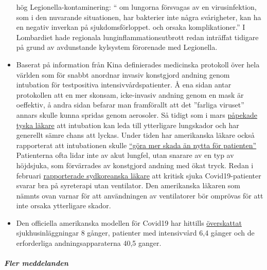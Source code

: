 \begin{itemize}
  hög Legionella-kontaminering: `` om lungorna försvagas av en
  virusinfektion, som i den nuvarande situationen, har bakterier inte
  några svårigheter, kan ha en negativ inverkan på sjukdomsförloppet.
  och orsaka komplikationer.'' I Lombardiet hade regionala
  lunginflammationsutbrott redan inträffat tidigare på grund av
  avdunstande kylsystem förorenade med Legionella.
\item
  Baserat på information från Kina definierades medicinska protokoll
  över hela världen som för snabbt anordnar invasiv konstgjord andning
  genom intubation för testpositiva intensivvårdspatienter. Å ena sidan
  antar protokollen att en mer skonsam, icke-invasiv andning genom en
  mask är oeffektiv, å andra sidan befarar man framförallt att det
  ''farliga viruset'' annars skulle kunna spridas genom aerosoler. Så
  tidigt som i mars
  \href{https://www.doccheck.com/de/detail/articles/26271-covid-19-beatmung-und-dann}{påpekade
  tyska läkare} att intubation kan leda till ytterligare lungskador och
  har generellt sämre chans att lyckas. Under tiden har amerikanska
  läkare också rapporterat att intubationen skulle
  \href{https://www.youtube.com/watch?v=k9GYTc53r2o}{``göra mer skada än
  nytta för patienten''} Patienterna ofta lidar inte av akut lungfel,
  utan snarare av en typ av höjdsjuka, som förvärrades av konstgjord
  andning med ökat tryck. Redan i februari
  \href{https://www.upi.com/Top_News/World-News/2020/02/14/Oxygen-therapy-working-for-coronavirus-patient-Seoul-says/6651581696794/}{rapporterade
  sydkoreanska läkare} att kritisk sjuka Covid19-patienter svarar bra på
  syreterapi utan ventilator. Den amerikanska läkaren som nämnts ovan
  varnar för att användningen av ventilatorer bör omprövas för att inte
  orsaka ytterligare skador.
\item
  Den officiella amerikanska modellen för Covid19 har hittills
  \href{https://twitter.com/NikolovScience/status/1246823479820693505}{överskattat}
  sjukhusinläggningar 8 gånger, patienter med intensivvård 6,4 gånger
  och de erforderliga andningsapparaterna 40,5 ganger.
\end{itemize}

\hypertarget{fler-meddelanden}{%
\subparagraph{\texorpdfstring{\textbf{Fler
meddelanden}}{Fler meddelanden}}\label{fler-meddelanden}}


